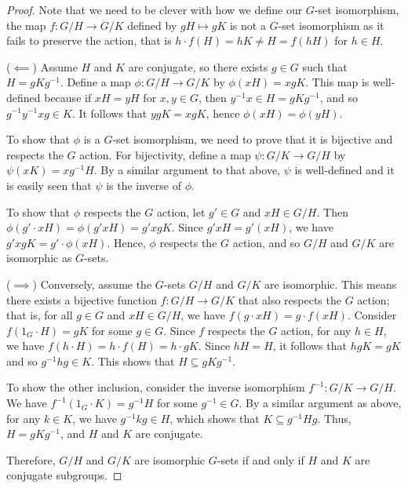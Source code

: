 \begin{proof}
Note that we need to be clever with how we define our $G$-set isomorphism, the map $f: G/H\to G/K$ defined by $gH\mapsto gK$ is not a $G$-set isomorphism as it fails to preserve the action, that is $h \cdot f(H) = hK \neq H = f(hH)$ for $h \in H$.

($\impliedby$) Assume $H$ and $K$ are conjugate, so there exists $g \in G$ such that $H = gKg^{-1}$. Define a map $\phi: G / H \rightarrow G / K$ by $\phi(xH) = xgK$. This map is well-defined because if $xH = yH$ for $x, y \in G$, then $y^{-1}x \in H = gKg^{-1}$, and so $g^{-1}y^{-1}xg \in K$. It follows that $ygK = xgK$, hence $\phi(xH) = \phi(yH)$.

To show that $\phi$ is a $G$-set isomorphism, we need to prove that it is bijective and respects the $G$ action. For bijectivity, define a map $\psi: G / K \rightarrow G / H$ by $\psi(xK) = xg^{-1}H$. By a similar argument to that above, $\psi$ is well-defined and it is easily seen that $\psi$ is the inverse of $\phi$. 

To show that $\phi$ respects the $G$ action, let $g' \in G$ and $xH \in G / H$. Then $\phi(g' \cdot xH) = \phi(g'xH) = g'xgK$. Since $g'xH = g'(xH)$, we have $g'xgK = g' \cdot \phi(xH)$. Hence, $\phi$ respects the $G$ action, and so $G / H$ and $G / K$ are isomorphic as $G$-sets.

($\implies$) Conversely, assume the $G$-sets $G / H$ and $G / K$ are isomorphic. This means there exists a bijective function $f: G / H \rightarrow G / K$ that also respects the $G$ action; that is, for all $g \in G$ and $xH \in G / H$, we have $f(g \cdot xH) = g \cdot f(xH)$. Consider $f(1_G \cdot H) = gK$ for some $g \in G$. Since $f$ respects the $G$ action, for any $h \in H$, we have $f(h \cdot H) = h \cdot f(H) = h \cdot gK$. Since $hH = H$, it follows that $hgK = gK$ and so $g^{-1}hg \in K$. This shows that $H \subseteq gKg^{-1}$. 

To show the other inclusion, consider the inverse isomorphism $f^{-1}: G / K \rightarrow G / H$. We have $f^{-1}(1_G \cdot K) = g^{-1}H$ for some $g^{-1} \in G$. By a similar argument as above, for any $k \in K$, we have $g^{-1}kg \in H$, which shows that $K \subseteq g^{-1}Hg$. Thus, $H = gKg^{-1}$, and $H$ and $K$ are conjugate.

Therefore, $G / H$ and $G / K$ are isomorphic $G$-sets if and only if $H$ and $K$ are conjugate subgroups.
\end{proof}